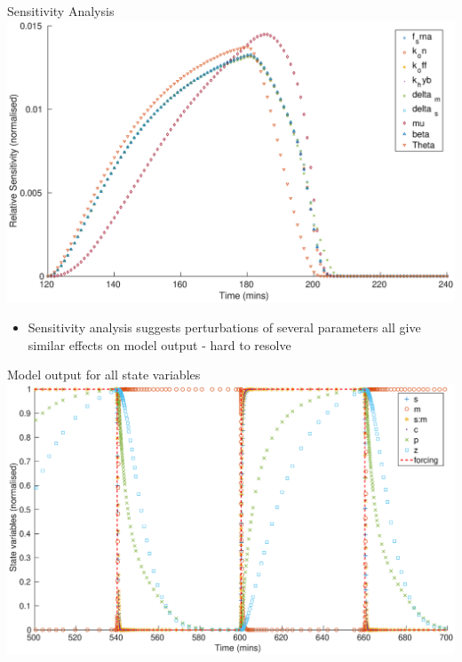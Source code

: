 \documentclass{beamer}
\begin{document}
\begin{frame}{Sensitivity Analysis}
  \includegraphics[scale = 0.22, clip = true, trim = 00 0 0 0]{../Figures/Sensitivty_scaled_other}
          \begin{itemize}
    \item Sensitivity analysis suggests perturbations of several parameters all give similar effects on model output - \alert{hard to resolve}
            \end{itemize}
\end{frame}

\begin{frame}{Model output for all state variables}
  \includegraphics[scale = 0.25, clip = true, trim = 30 0 0 0]{../Figures/model_output}
\end{frame}
\end{document}
